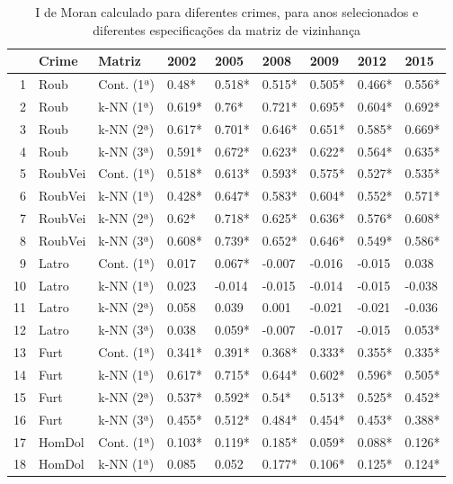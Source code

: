 \documentclass[12pt,openright,oneside,a4paper,english,french,spanish]{abntex2}
\numberwithin{table}{section} %
\numberwithin{figure}{section} %
\begin{document}
\begin{table}[H]
\begin{center}
\begin{small}
\caption{I de Moran calculado para diferentes crimes, para anos selecionados e diferentes especificações da matriz de vizinhança}
\label{tab:I_de_Moran}
\centering
\begin{tabular}{rllllllll}
  \hline
 & Crime & Matriz & 2002 & 2005 & 2008 & 2009 & 2012 & 2015 \\ 
  \hline
1 & Roub & Cont. (1ª) & 0.48* & 0.518* & 0.515* & 0.505* & 0.466* & 0.556* \\ 
  2 & Roub & k-NN (1ª) & 0.619* & 0.76* & 0.721* & 0.695* & 0.604* & 0.692* \\ 
  3 & Roub & k-NN (2ª) & 0.617* & 0.701* & 0.646* & 0.651* & 0.585* & 0.669* \\ 
  4 & Roub & k-NN (3ª) & 0.591* & 0.672* & 0.623* & 0.622* & 0.564* & 0.635* \\ 
  5 & RoubVei & Cont. (1ª) & 0.518* & 0.613* & 0.593* & 0.575* & 0.527* & 0.535* \\ 
  6 & RoubVei & k-NN (1ª) & 0.428* & 0.647* & 0.583* & 0.604* & 0.552* & 0.571* \\ 
  7 & RoubVei & k-NN (2ª) & 0.62* & 0.718* & 0.625* & 0.636* & 0.576* & 0.608* \\ 
  8 & RoubVei & k-NN (3ª) & 0.608* & 0.739* & 0.652* & 0.646* & 0.549* & 0.586* \\ 
  9 & Latro & Cont. (1ª) & 0.017 & 0.067* & -0.007 & -0.016 & -0.015 & 0.038 \\ 
  10 & Latro & k-NN (1ª) & 0.023 & -0.014 & -0.015 & -0.014 & -0.015 & -0.038 \\ 
  11 & Latro & k-NN (2ª) & 0.058 & 0.039 & 0.001 & -0.021 & -0.021 & -0.036 \\ 
  12 & Latro & k-NN (3ª) & 0.038 & 0.059* & -0.007 & -0.017 & -0.015 & 0.053* \\ 
  13 & Furt & Cont. (1ª) & 0.341* & 0.391* & 0.368* & 0.333* & 0.355* & 0.335* \\ 
  14 & Furt & k-NN (1ª) & 0.617* & 0.715* & 0.644* & 0.602* & 0.596* & 0.505* \\ 
  15 & Furt & k-NN (2ª) & 0.537* & 0.592* & 0.54* & 0.513* & 0.525* & 0.452* \\ 
  16 & Furt & k-NN (3ª) & 0.455* & 0.512* & 0.484* & 0.454* & 0.453* & 0.388* \\ 
  17 & HomDol & Cont. (1ª) & 0.103* & 0.119* & 0.185* & 0.059* & 0.088* & 0.126* \\ 
  18 & HomDol & k-NN (1ª) & 0.085 & 0.052 & 0.177* & 0.106* & 0.125* & 0.124* \\ 

\end{tabular}
\end{small}
\end{center}
\end{table}
\end{document}

